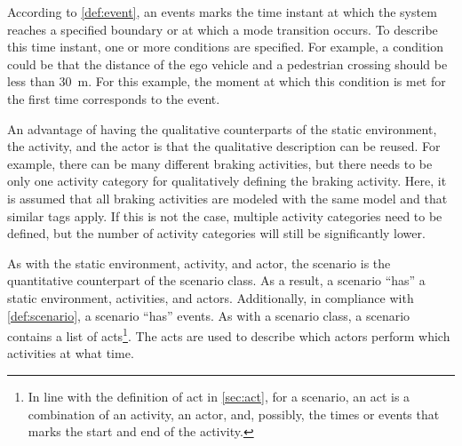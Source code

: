 According to \cref{def:event}, an events marks the time instant at which the system reaches a specified boundary or at which a mode transition occurs. To describe this time instant, one or more conditions are specified. For example, a condition could be that the distance of the ego vehicle and a pedestrian crossing should be less than \SI{30}{\meter}. For this example, the moment at which this condition is met for the first time corresponds to the event.

An advantage of having the qualitative counterparts of the static environment, the activity, and the actor is that the qualitative description can be reused. For example, there can be many different braking activities, but there needs to be only one activity category for qualitatively defining the braking activity. Here, it is assumed that all braking activities are modeled with the same model and that similar tags apply. If this is not the case, multiple activity categories need to be defined, but the number of activity categories will still be significantly lower.

As with the static environment, activity, and actor, the scenario is the quantitative counterpart of the scenario class. As a result, a scenario ``has'' a static environment, activities, and actors. Additionally, in compliance with \cref{def:scenario}, a scenario ``has'' events. As with a scenario class, a scenario contains a list of acts\cbstartc\footnote{\cbstartc In line with the definition of act in \cref{sec:act}, for a scenario, an act is a combination of an activity, an actor, and, possibly, the times or events that marks the start and end of the activity.\cbend}. The acts are used to describe which actors perform which activities at what time.\cbend
